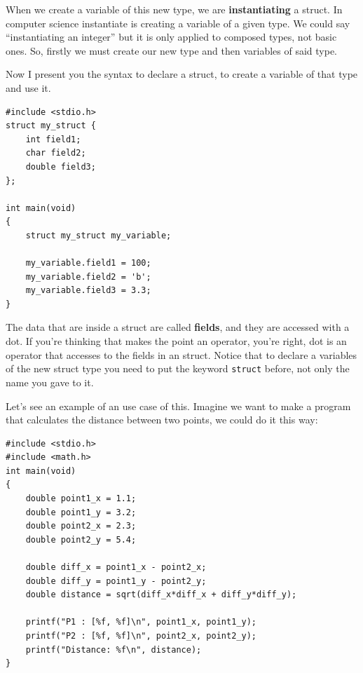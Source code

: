 \documentclass[a4paper]{article}
\begin{document}
When we create a variable of this new type, we are \textbf{instantiating} a
struct. In computer science instantiate is creating a variable of a given type.
We could say ``instantiating an integer'' but it is only applied to composed
types, not basic ones. So, firstly we must create our new type and then
variables of said type.

Now I present you the syntax to declare a struct, to create a variable
of that type and use it.

\noindent
\begin{minipage}[H]{\linewidth}
\mbox{}
\begin{lstlisting}[style=C,
caption={Declaration, instantiation and use of a \textit{struct}},
label={lst:structUse}]
#include <stdio.h>
struct my_struct {
    int field1;
    char field2;
    double field3;
};

int main(void)
{
    struct my_struct my_variable;

    my_variable.field1 = 100;
    my_variable.field2 = 'b';
    my_variable.field3 = 3.3;
}
\end{lstlisting}
\end{minipage}

The data that are inside a struct are called \textbf{fields}, and they are
accessed with a dot. If you're thinking that makes the point an operator,
you're right, dot is an operator that accesses to the fields in an struct.
Notice that to declare a variables of the new struct type you need to
put the keyword \lstinline[style=C]"struct" before, not only the name you gave
to it.

Let's see an example of an use case of this. Imagine we want to make a program
that calculates the distance between two points, we could do it this way:

\noindent
\begin{minipage}[H]{\linewidth}
\mbox{}
\begin{lstlisting}[style=C,
caption={Example of calculation of distance between points in a plane},
label={lst:pointNoStruct}]
#include <stdio.h>
#include <math.h>
int main(void)
{
    double point1_x = 1.1;
    double point1_y = 3.2;
    double point2_x = 2.3;
    double point2_y = 5.4;

    double diff_x = point1_x - point2_x;
    double diff_y = point1_y - point2_y;
    double distance = sqrt(diff_x*diff_x + diff_y*diff_y);

    printf("P1 : [%f, %f]\n", point1_x, point1_y);
    printf("P2 : [%f, %f]\n", point2_x, point2_y);
    printf("Distance: %f\n", distance);
}
\end{lstlisting}
\end{minipage}
\end{document}
